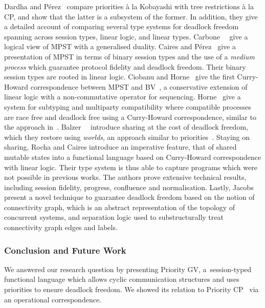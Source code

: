 Dardha and P\'{e}rez~\cite{dardhaperez15extended,dardhaperez15,DardhaP22} compare priorities \`a la Kobayashi with tree restrictions \`a la CP, and show that the latter is a subsystem of the former. In addition, they give a detailed account of comparing several type systems for deadlock freedom spanning across session types, linear logic, and linear types.
Carbone~\etal~\cite{CarboneMSY15,carbonelindley16} give a logical view of MPST with a generalised duality.
Caires and P\'{e}rez~\cite{CairesP16} give a presentation of MPST in terms of binary session types and the use of a \emph{medium process} which guarantee protocol fidelity and deadlock freedom. Their binary session types are rooted in linear logic.
Ciobanu and Horne~\cite{CiobanuH15} give the first Curry-Howard correspondence between MPST and BV~\cite{Guglielmi07}, a conservative extension of linear logic with a non-commutative operator for sequencing.
Horne~\cite{Horne20} give a system for subtyping and multiparty compatibility where compatible processes are race free and deadlock free using a Curry-Howard correspondence, similar to the approach in~\cite{CiobanuH15}.
Balzer~\etal~\cite{balzerpfenning17} introduce sharing at the cost of deadlock freedom, which they restore using \emph{worlds}, an approach similar to priorities~\cite{balzertoninho19}.
Staying on sharing, Rocha and Caires \cite{rochacaires21} introduce an imperative feature, that of shared mutable states into a functional language based on Curry-Howard correspondence with linear logic. Their type system is thus able to capture programs which were not possible in previous works. The authors prove extensive technical results, including session fidelity, progress, confluence and
normalisation.
Lastly, Jacobs \etal \cite{JacobsBK22a} present a novel technique to guarantee deadlock freedom based on the notion of connectivity graph, which is an abstract representation of the topology of concurrent systems, and separation logic used to substructurally treat connectivity graph edges and labels.


\subsubsection*{Conclusion and Future Work}
We answered our research question by presenting Priority GV, a~session-typed functional language which allows cyclic communication structures and uses priorities to ensure deadlock freedom. We showed its relation to Priority CP~\cite{dardhagay18extended} via an operational correspondence.


